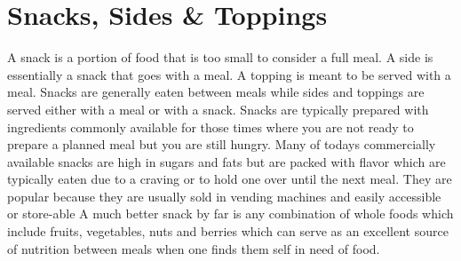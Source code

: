 \AddToShipoutPicture*{\FruitBowl}
\chapter{Snacks, Sides \& Toppings}

A snack is a portion of food that is too small to consider a full meal. A side is essentially a snack that goes with a meal. A topping is meant to be served with a meal. Snacks are generally eaten between meals while sides and toppings are served either with a meal or with a snack. Snacks are typically prepared with ingredients commonly available for those times where you are not ready to prepare a planned meal but you are still hungry. Many of todays commercially available snacks are high in sugars and fats but are packed with flavor which are typically eaten due to a craving or to hold one over until the next meal. They are popular because they are usually sold in vending machines and easily accessible or store-able A much better snack by far is any combination of whole foods which include fruits, vegetables, nuts and berries which can serve as an excellent source of nutrition between meals when one finds them self in need of food. 